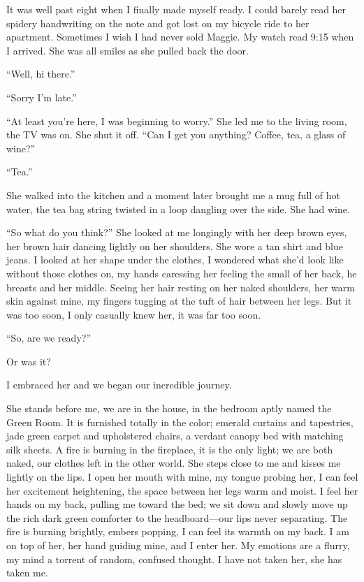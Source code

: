 It was well past eight when I finally made myself ready. I could barely
read her spidery handwriting on the note and got lost on my bicycle ride
to her apartment. Sometimes I wish I had never sold Maggie. My watch
read 9:15 when I arrived. She was all smiles as she pulled back the
door.

``Well, hi there.''

``Sorry I'm late.''

``At least you're here, I was beginning to worry.'' She led me to the
living room, the TV was on. She shut it off. ``Can I get you anything?
Coffee, tea, a glass of wine?''

``Tea.''

She walked into the kitchen and a moment later brought me a mug full of
hot water, the tea bag string twisted in a loop dangling over the side.
She had wine.

``So what do you think?'' She looked at me longingly with her deep brown
eyes, her brown hair dancing lightly on her shoulders. She wore a tan
shirt and blue jeans. I looked at her shape under the clothes, I
wondered what she'd look like without those clothes on, my hands
caressing her feeling the small of her back, he breasts and her middle.
Seeing her hair resting on her naked shoulders, her warm skin against
mine, my fingers tugging at the tuft of hair between her legs. But it
was too soon, I only casually knew her, it was far too soon.

``So, are we ready?''

Or was it?

I embraced her and we began our incredible journey.

She stands before me, we are in the house, in the bedroom aptly named
the Green Room. It is furnished totally in the color; emerald curtains
and tapestries, jade green carpet and upholstered chairs, a verdant
canopy bed with matching silk sheets. A fire is burning in the
fireplace, it is the only light; we are both naked, our clothes left in
the other world. She steps close to me and kisses me lightly on the
lips. I open her mouth with mine, my tongue probing her, I can feel her
excitement heightening, the space between her legs warm and moist. I
feel her hands on my back, pulling me toward the bed; we sit down and
slowly move up the rich dark green comforter to the headboard---our lips
never separating. The fire is burning brightly, embers popping, I can
feel its warmth on my back. I am on top of her, her hand guiding mine,
and I enter her. My emotions are a flurry, my mind a torrent of random,
confused thought. I have not taken her, she has taken me.

